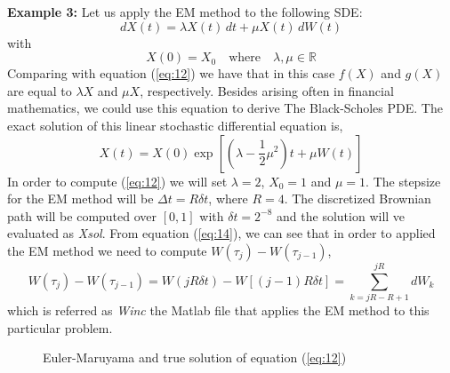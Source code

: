 \documentclass[12pt,a4paper]{article}
\def\d{\delta}
\def\l{\lambda}
\def\m{\mu}
\begin{document}
\noindent \textbf{Example 3:}
Let us apply the EM method to the following SDE: 
\begin{equation} \label{eq:15}
dX(t)=\l X(t)\,dt+\m X(t)\,dW(t) 
\end{equation}
with $$X(0)=X_0 \quad \text{where} \quad \l,\m \in \mathbb{R}$$
Comparing with equation (\ref{eq:12}) we have that in this case $f(X)$ and $g(X)$ are equal to $\l X$ and $\m X$, respectively. Besides arising often in financial mathematics, we could use this equation to derive The Black-Scholes PDE. The exact solution of this linear stochastic differential equation is, 
\begin{equation} \label{eq:16}
X(t)=X(0)\exp\left[\left(\l -\frac{1}{2}\m^2\right)t+\m W(t)\right]
\end{equation}
In order to compute (\ref{eq:12}) we will set $\l=2$, $X_0=1$ and $\m=1$. The stepsize for the EM method will be $\Delta t=R\d t$, where $R=4$. The discretized Brownian path will be computed over $[0,1]$ with $\d t = 2^{-8}$ and the solution will ve evaluated as \textit{Xsol}. From equation (\ref{eq:14}), we can see that in order to applied the EM method we need to compute $W(\tau_j)-W(\tau_{j-1})$, 
\begin{equation} \label{eq:17}
W(\tau_j)-W(\tau_{j-1})=W(jR\d t)-W\left[(j-1)R\d t\right]=\sum_{k=jR-R+1}^{jR}dW_k
\end{equation}
which is referred as \textsl{Winc} the Matlab file that applies the EM method to this particular problem. 
\begin{figure}[H]
\caption{Euler-Maruyama and true solution of equation (\ref{eq:12})}  \label{fig:fig3}
\begin{center}
\end{center}
\end{figure}
\end{document}
